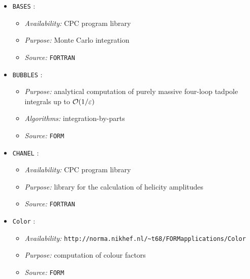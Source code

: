 \newlength{\savebaselineskip}
\setlength{\savebaselineskip}{\baselineskip}
\begin{itemize}
\setlength{\baselineskip}{.5em}


\item{\tt BASES} \cite{BASES/SPRING}:
  \begin{itemize}
  \item{\it Availability:} CPC program library
  \item{\it Purpose:} Monte Carlo integration
  \item{\it Source:} {\tt FORTRAN}
  \end{itemize}
  

\item{\tt BUBBLES} \cite{bubbles}:
  \begin{itemize}
  \item{\it Purpose:} analytical computation of purely massive
    four-loop tadpole integrals up to ${\cal O}(1/\varepsilon)$
  \item{\it Algorithms:} integration-by-parts
  \item{\it Source:} {\tt FORM}
  \end{itemize}
  

\item{\tt CHANEL} \cite{CHANEL}:
  \begin{itemize}
  \item{\it Availability:} CPC program library
  \item{\it Purpose:} library for the calculation of helicity amplitudes
  \item{\it Source:} {\tt FORTRAN}
  \end{itemize}
  

\item {\tt Color} \cite{color}:
  \begin{itemize}
  \item {\it Availability:}
    {\tt http://norma.nikhef.nl/\~\/t68/FORMapplications/Color}
  \item{\it Purpose:} computation of colour factors
  \item {\it Source:} {\tt FORM}
  \end{itemize}
  


\end{itemize}
